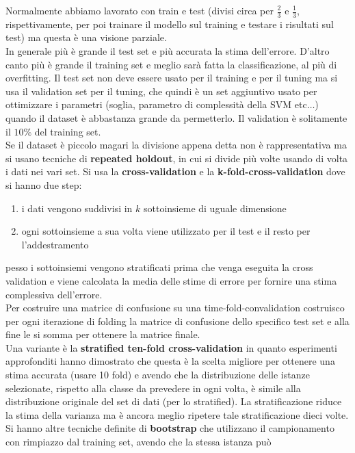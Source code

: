 Normalmente abbiamo lavorato con train e test (divisi circa per $\frac{2}{3}$ e
$\frac{1}{3}$, rispettivamente, per poi trainare il modello sul training e
testare i risultati sul test) ma questa è una visione parziale.  \\
In generale più è grande il test set e più accurata la stima
dell'errore. D'altro canto più è grande il training set e meglio sarà fatta la
classificazione, al più di overfitting. Il test set non deve essere usato per il
training e per il tuning ma si usa il validation set per il tuning, che quindi è
un set aggiuntivo usato per ottimizzare i parametri (soglia, parametro di
complessità della SVM etc$\ldots$) quando il dataset è abbastanza grande da
permetterlo. Il validation è solitamente il $10\%$ del training set.\\
Se il dataset è piccolo magari la divisione appena detta non è rappresentativa
ma si usano tecniche di \textbf{repeated holdout}, in cui si divide più volte
usando di volta i dati nei vari set. Si usa la \textbf{cross-validation} e la
\textbf{k-fold-cross-validation} dove si hanno due step:
\begin{enumerate}
  \item i dati vengono suddivisi in $k$ sottoinsieme di uguale dimensione 
  \item ogni sottoinsieme a sua volta viene utilizzato per il test e il resto
  per l'addestramento 
\end{enumerate}
pesso i sottoinsiemi vengono stratificati prima che venga eseguita la cross
validation e viene calcolata la media delle stime di errore per fornire una 
stima complessiva dell'errore.\\
Per costruire una matrice di confusione su una time-fold-convalidation
costruisco per ogni iterazione di folding la matrice di confusione dello
specifico test set e alla fine le si somma per ottenere la matrice finale.\\
Una variante è la \textbf{stratified ten-fold cross-validation} in quanto
esperimenti approfonditi hanno dimostrato che questa è la scelta migliore per
ottenere una stima accurata (usare 10 fold) e avendo che la distribuzione delle
istanze selezionate, rispetto alla classe da prevedere in ogni volta, è simile
alla distribuzione originale del set di dati (per lo stratified). La
stratificazione riduce la stima  
della varianza ma è ancora meglio ripetere tale stratificazione dieci volte.\\
Si hanno altre tecniche definite di \textbf{bootstrap} che utilizzano il
campionamento con rimpiazzo dal training set, avendo che la stessa istanza può
